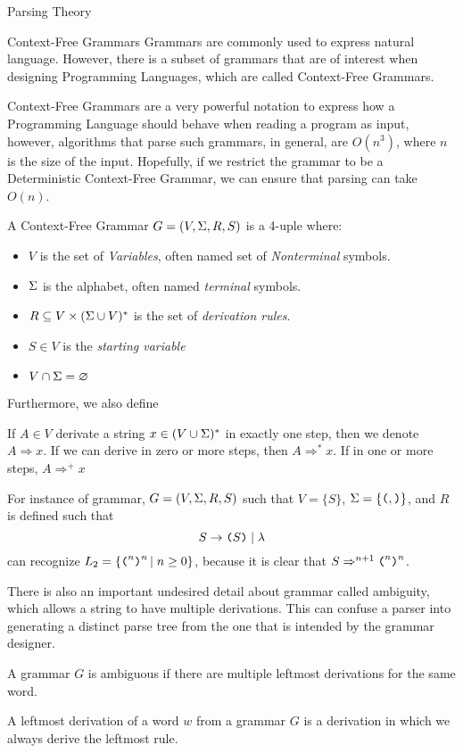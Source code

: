 \begin{section}{Parsing Theory}
\begin{subsection}{Context-Free Grammars}
Grammars are commonly used to express natural language. However, there is
a subset of grammars that are of interest when designing
Programming Languages, which are called Context-Free Grammars.

Context-Free Grammars are a very powerful notation to express how a Programming Language
should behave when reading a program as input, however, algorithms that parse
such grammars, in general, are $O(n^3)$, where $n$ is the size of the input. Hopefully,
if we restrict the grammar to be a Deterministic Context-Free Grammar, we can ensure
that parsing can take $O(n)$.

\begin{definition}
A Context-Free Grammar $G = (V, \Sigma, R, S)$ is a 4-uple where:
\begin{itemize}
	\item $V$ is the set of \textit{Variables}, often named set of
	\textit{Nonterminal} symbols.
	\item $\Sigma$ is the alphabet, often named \textit{terminal} symbols.
	\item $R \subseteq V \times (\Sigma \cup V)^*$ is the set of \textit{derivation rules}.
	\item $S \in V$ is the \textit{starting variable}
	\item $V \cap \Sigma = \varnothing$
\end{itemize}
\end{definition}

Furthermore, we also define

\begin{definition}
	If $A \in V$ derivate a string $x \in (V \cup \Sigma)^*$ in exactly one step, then
	we denote $A \Rightarrow x$. If we can derive in zero or more steps, then
	$A \Rightarrow^* x$. If in one or more steps, $A \Rightarrow^+ x$
\end{definition}

For instance of grammar, $G = (V, \Sigma, R, S)$ such that
$V = \{S\}$, $\Sigma = \{\texttt{(}, \texttt{)}\}$, and $R$ is defined such that
$$S \rightarrow \texttt{(} S\texttt{)} \; | \; \lambda$$
can recognize $L_2 = \{\texttt{(}^n \texttt{)}^n\,|\;n \geq 0\}$, because it is clear that
$S \Rightarrow^{n+1} \texttt{(}^n\texttt{)}^n$.

There is also an important undesired detail about grammar called ambiguity, which
allows a string to have multiple derivations. This can confuse a parser into
generating a distinct parse tree from the one that is intended by the grammar
designer.

\begin{definition}
	A grammar $G$ is ambiguous if there are multiple leftmost derivations for the same
	word.
\end{definition}
\begin{definition}
	A leftmost derivation of a word $w$ from a grammar $G$ is a derivation
	in which we always derive the leftmost rule.
\end{definition}


\end{subsection}
\end{section}
